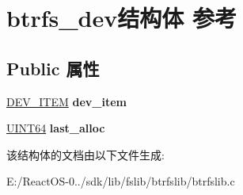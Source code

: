 \hypertarget{structbtrfs__dev}{}\section{btrfs\+\_\+dev结构体 参考}
\label{structbtrfs__dev}
\subsection*{Public 属性}
\begin{DoxyCompactItemize}
\item 
\mbox{\label{structbtrfs__dev_abe9c79e54148862811ad9de4c373e7cd}} 
\hyperlink{struct_d_e_v___i_t_e_m}{D\+E\+V\+\_\+\+I\+T\+EM} {\bfseries dev\+\_\+item}
\item 
\mbox{\label{structbtrfs__dev_adbee1c7f74641ce5006c4a994b357a25}} 
\hyperlink{_processor_bind_8h_a57be03562867144161c1bfee95ca8f7c}{U\+I\+N\+T64} {\bfseries last\+\_\+alloc}
\end{DoxyCompactItemize}


该结构体的文档由以下文件生成\+:\begin{DoxyCompactItemize}
\item 
E\+:/\+React\+O\+S-\/0../sdk/lib/fslib/btrfslib/btrfslib.\+c\end{DoxyCompactItemize}
